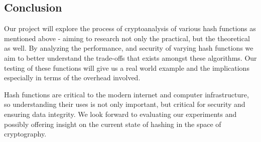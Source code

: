 \documentclass[12pt,english]{article}
\begin{document}
\subsection{Conclusion}
Our project will explore the process of cryptoanalysis of various 
hash functions as mentioned above - aiming to research not 
only the practical, but the theoretical as well. 
By analyzing the performance, 
and security of varying hash functions we aim to 
better understand the trade-offs that exists amongst 
these algorithms. Our testing of these functions will 
give us a real world example and the implications especially 
in terms of the overhead involved.

Hash functions are critical to the modern internet 
and computer infrastructure, so understanding their uses 
is not only important, but critical for security and ensuring 
data integrity. We look forward to evaluating our experiments 
and possibly offering insight on the current state of hashing 
in the space of cryptography.
\end{document}

